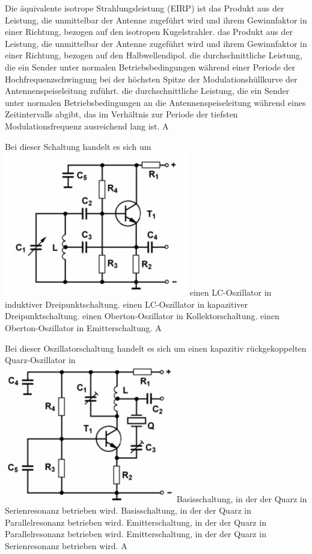 {Die äquivalente isotrope Strahlungsleistung (EIRP) ist}%
{das Produkt aus der Leistung, die unmittelbar der Antenne zugeführt wird und ihrem Gewinnfaktor in einer Richtung, bezogen auf den isotropen Kugelstrahler.}%
{das Produkt aus der Leistung, die unmittelbar der Antenne zugeführt wird und ihrem Gewinnfaktor in einer Richtung, bezogen auf den Halbwellendipol.}%
{die durchschnittliche Leistung, die ein Sender unter normalen Betriebsbedingungen während einer Periode der Hochfrequenzschwingung bei der höchsten Spitze der Modulationshüllkurve der Antennenspeiseleitung zuführt.}%
{die durchschnittliche Leistung, die ein Sender unter normalen Betriebsbedingungen an die Antennenspeiseleitung während eines Zeitintervalls abgibt, das im Verhältnis zur Periode der tiefsten Modulationsfrequenz ausreichend lang ist.}%
{A}%



{Bei dieser Schaltung handelt es sich um\\
\includegraphics[scale=0.5]{Oszillator/Bilder/TD603.png}}%
{einen LC-Oszillator in induktiver Dreipunktschaltung.}%
{einen LC-Oszillator in kapazitiver Dreipunktschaltung.}%
{einen Oberton-Oszillator in Kollektorschaltung.}%
{einen Oberton-Oszillator in Emitterschaltung.}%
{A}%


{Bei dieser Oszillatorschaltung handelt es sich um einen kapazitiv rückgekoppelten Quarz-Oszillator in\\
\includegraphics[scale=0.5]{Oszillator/Bilder/TD605.png}}%
{Basisschaltung, in der der Quarz in Serienresonanz betrieben wird.}%
{Basisschaltung, in der der Quarz in Parallelresonanz betrieben wird.}%
{Emitterschaltung, in der der Quarz in Parallelresonanz betrieben wird.}%
{Emitterschaltung, in der der Quarz in Serienresonanz betrieben wird.}%
{A}%